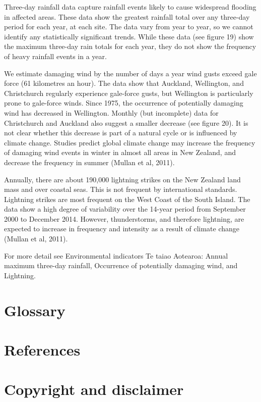 \documentclass[11pt]{mfe-nzers} %
\begin{document}
Three-day rainfall data capture rainfall events likely to cause widespread flooding in affected areas. These data show the greatest rainfall total over any three-day period for each year, at each site. The data vary from year to year, so we cannot identify any statistically significant trends. While these data (see figure 19) show the maximum three-day rain totals for each year, they do not show the frequency of heavy rainfall events in a year.


We estimate damaging wind by the number of days a year wind gusts exceed gale force (61 kilometres an hour). The data show that Auckland, Wellington, and Christchurch regularly experience gale-force gusts, but Wellington is particularly prone to gale-force winds. Since 1975, the occurrence of potentially damaging wind has decreased in Wellington. Monthly (but incomplete) data for Christchurch and Auckland also suggest a smaller decrease (see figure 20). It is not clear whether this decrease is part of a natural cycle or is influenced by climate change. Studies predict global climate change may increase the frequency of damaging wind events in winter in almost all areas in New Zealand, and decrease the frequency in summer (Mullan et al, 2011).


Annually, there are about 190,000 lightning strikes on the New Zealand land mass and over coastal seas. This is not frequent by international standards. Lightning strikes are most frequent on the West Coast of the South Island. The data show a high degree of variability over the 14-year period from September 2000 to December 2014. However, thunderstorms, and therefore lightning, are expected to increase in frequency and intensity as a result of climate change (Mullan et al, 2011).

For more detail see Environmental indicators Te taiao Aotearoa: Annual maximum three-day rainfall, Occurrence of potentially damaging wind, and Lightning.

\section{Glossary}

\section{References}

\section{Copyright and disclaimer}
\end{document}
